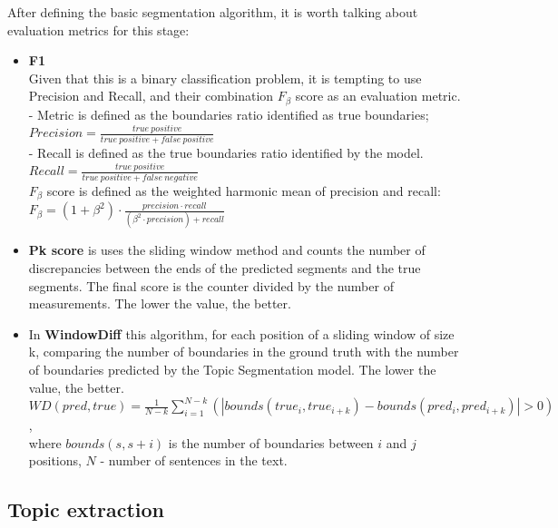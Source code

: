 \documentclass[PMI,VKR]{HSEUniversity}
\begin{document}
After defining the basic segmentation algorithm, it is worth talking about evaluation metrics for this stage:
\begin{itemize}
    \item \textbf{F1}\\
    Given that this is a binary classification problem, it is tempting to use Precision and Recall, and their combination $F_{\beta}$ score as an evaluation metric. \\ 
     - Metric is defined as the boundaries ratio identified as true boundaries; \\
       $Precision = \frac{true \: positive}{true \: positive + false \: positive}$ \\
     - Recall is defined as the true boundaries ratio identified by the model. \\
       $Recall = \frac{true \: positive}{true \: positive + false \: negative}$ \\
    $F_{\beta}$ score is defined as the weighted harmonic mean of precision and recall: \\
    $F_{\beta} = (1 + \beta^{2}) \cdot \frac{precision \cdot recall}{(\beta^{2} \cdot precision) + recall}$
    \item \textbf{Pk score} \cite{pk:1999} is uses the sliding window method and counts the number of discrepancies between the ends of the predicted segments and the true segments. The final score is the counter divided by the number of measurements. The lower the value, the better.
    \item In \textbf{WindowDiff} \cite{wd:2002} this algorithm, for each position of a sliding window of size k, comparing the number of boundaries in the ground truth with the number of boundaries predicted by the Topic Segmentation model. The lower the value, the better.\\
    $WD(pred, true) = \frac{1}{N - k}\sum_{i = 1}^{N - k}(\left\lvert bounds(true_{i}, true_{i + k}) - bounds(pred_{i}, pred_{i + k})\right\rvert > 0)$, \\ 
    where $bounds(s, s + i)$ is the number of boundaries between $i$ and $j$ positions, $N$ - number of sentences in the text.
\end{itemize} 

\subsection{Topic extraction}
\end{document}

